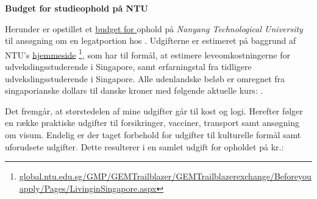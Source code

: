 \documentclass[../Ansoegning.tex]{subfiles}
\begin{document}
\vspace{-5ex}
\begin{center}
    \textbf{\LARGE{Budget for studieophold på NTU}}\vspace{-3ex}
\end{center}

Herunder er opstillet et \underline{budget for \Periodes} ophold på \textit{Nanyang Technological University} til ansøgning om en legatportion hos \textit{\FondNavn}. Udgifterne er estimeret på baggrund af NTU's {\underline{\href{https://global.ntu.edu.sg/GMP/GEMTrailblazer/GEMTrailblazerexchange/Beforeyouapply/Pages/LivinginSingapore.aspx?fbclid=IwAR1wz42j8teW7sBJjKLteay74tG7sBoB6nE7yAiWv1teHnOvs5v-Vj8tjvA}{hjemmeside}}} \footnote{\vspace{-15mm} \href{global.ntu.edu.sg/GMP/GEMTrailblazer/GEMTrailblazerexchange/Beforeyouapply/Pages/LivinginSingapore.aspx}{global.ntu.edu.sg/GMP/GEMTrailblazer/GEMTrailblazerexchange/Beforeyouapply/Pages/LivinginSingapore.aspx}}, som har til formål, at estimere leveomkostningerne for udvekslingsstuderende i Singapore, samt erfarningstal fra tidligere udvekslingsstuderende i Singapore. Alle udenlandske beløb er omregnet fra singaporianske dollars til danske kroner med følgende aktuelle kurs: \Kurs.

Det fremgår, at størstedelen af mine udgifter går til kost og logi. Herefter følger en række praktiske udgifter til forsikringer, vacciner, transport samt ansøgning om visum. Endelig er der taget forbehold for udgifter til kulturelle formål samt uforudsete udgifter. Dette resulterer i en samlet udgift for opholdet på \Udgift kr.: \vspace{-2mm}
\end{document}
